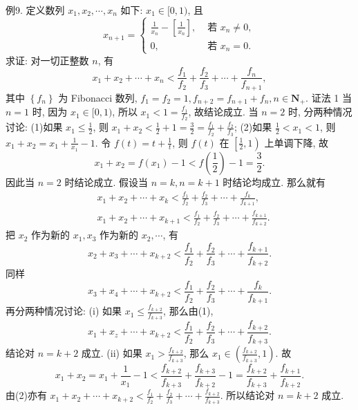 例9. 定义数列 $x_1, x_2, \cdots, x_n$ 如下: $x_1 \in[0,1)$, 且
$$
x_{n+1}= \begin{cases}\frac{1}{x_n}-\left[\frac{1}{x_n}\right], & \text { 若 } x_n \neq 0, \\ 0, & \text { 若 } x_n=0 .\end{cases}
$$
求证: 对一切正整数 $n$, 有
$$
x_1+x_2+\cdots+x_n<\frac{f_1}{f_2}+\frac{f_2}{f_3}+\cdots+\frac{f_n}{f_{n+1}},
$$
其中 $\left\{f_n\right\}$ 为 Fibonacci 数列, $f_1=f_2=1, f_{n+2}=f_{n+1}+f_n, n \in \mathbf{N}_{+}$.
证法 1 当 $n=1$ 时, 因为 $x_1 \in[0,1)$, 所以 $x_1<1=\frac{f_1}{f_2}$, 故结论成立.
当 $n=2$ 时, 分两种情况讨论:
(1)如果 $x_1 \leqslant \frac{1}{2}$, 则 $x_1+x_2<\frac{1}{2}+1=\frac{3}{2}=\frac{f_1}{f_2}+\frac{f_2}{f_3}$;
(2)如果 $\frac{1}{2}<x_1<1$, 则 $x_1+x_2=x_1+\frac{1}{x_1}-1$.
令 $f(t)=t+\frac{1}{t}$, 则 $f(t)$ 在 $\left[\frac{1}{2}, 1\right)$ 上单调下降, 故
$$
x_1+x_2=f\left(x_1\right)-1<f\left(\frac{1}{2}\right)-1=\frac{3}{2} .
$$
因此当 $n=2$ 时结论成立.
假设当 $n=k, n=k+1$ 时结论均成立.
那么就有
$$
\begin{aligned}
& x_1+x_2+\cdots+x_k<\frac{f_1}{f_2}+\frac{f_2}{f_3}+\cdots+\frac{f_k}{f_{k+1}}, \\
& x_1+x_2+\cdots+x_{k+1}<\frac{f_1}{f_2}+\frac{f_2}{f_3}+\cdots+\frac{f_{k+1}}{f_{k+2}} .
\end{aligned}
$$
把 $x_2$ 作为新的 $x_1, x_3$ 作为新的 $x_2, \cdots$, 有
$$
x_2+x_3+\cdots+x_{k+2}<\frac{f_1}{f_2}+\frac{f_2}{f_3}+\cdots+\frac{f_{k+1}}{f_{k+2}} . \label{(1)}
$$
同样
$$
x_3+x_4+\cdots+x_{k+2}<\frac{f_1}{f_2}+\frac{f_2}{f_3}+\cdots+\frac{f_k}{f_{k+1}} . \label{(2)}
$$
再分两种情况讨论:
(i) 如果 $x_1 \leqslant \frac{f_{k+2}}{f_{k+3}}$, 那么由(1),
$$
x_1+x_z+\cdots+x_{k+2}<\frac{f_1}{f_2}+\frac{f_2}{f_3}+\cdots+\frac{f_{k+2}}{f_{k+3}} .
$$
结论对 $n=k+2$ 成立.
(ii) 如果 $x_1>\frac{f_{k+2}}{f_{k+3}}$, 那么 $x_1 \in\left(\frac{f_{k+2}}{f_{k+3}}, 1\right)$. 故
$$
x_1+x_2=x_1+\frac{1}{x_1}-1<\frac{f_{k+2}}{f_{k+3}}+\frac{f_{k+3}}{f_{k+2}}-1=\frac{f_{k+2}}{f_{k+3}}+\frac{f_{k+1}}{f_{k+2}} .
$$
由(2)亦有 $x_1+x_2+\cdots+x_{k+2}<\frac{f_1}{f_2}+\frac{f_2}{f_3}+\cdots+\frac{f_{k+2}}{f_{k+3}}$.
所以结论对 $n=k+2$ 成立.



